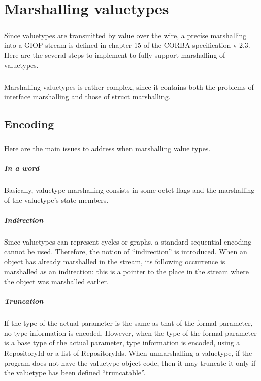 \chapter{Marshalling valuetypes}

\paragraph{}Since valuetypes are transmitted by value over the wire, a
precise marshalling into a GIOP stream is defined in chapter 15 of the
CORBA specification v 2.3. Here are the several steps to implement to
fully support marshalling of valuetypes.

\paragraph{}Marshalling valuetypes is rather complex, since it
contains both the problems of interface marshalling and those of
struct marshalling.

\section{Encoding}

\paragraph{}Here are the main issues to address when marshalling value types.

\paragraph{In a word}Basically, valuetype marshalling consists in some octet
flags and the marshalling of the valuetype's state members.

\paragraph{Indirection}Since valuetypes can represent cycles or
graphs, a standard sequential encoding cannot be used. Therefore, the
notion of ``indirection'' is introduced. When an object has already
marshalled in the stream, its following occurrence is marshalled as an
indirection: this is a pointer to the place in the stream where the
object was marshalled earlier.

\paragraph{Truncation}If the type of the actual parameter is the same as that of
the formal parameter, no type information is encoded. However, when
the type of the formal parameter is a base type of the actual
parameter, type information is encoded, using a RepositoryId or a list
of RepositoryIds. When unmarshalling a valuetype, if the program does
not have the valuetype object code, then it may truncate it only if
the valuetype has been defined ``truncatable''.

